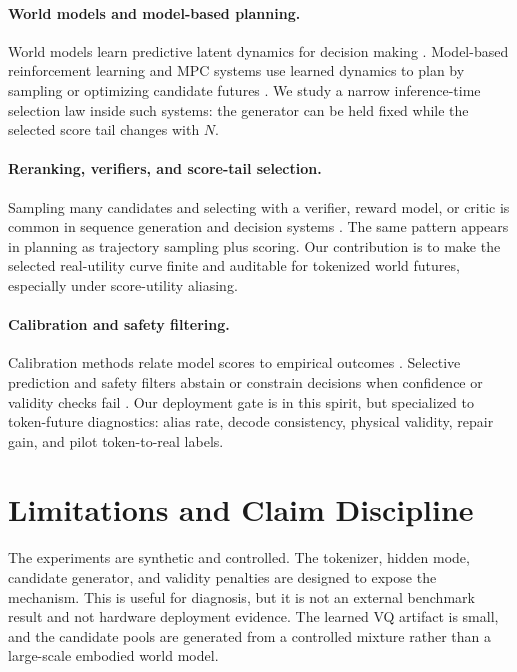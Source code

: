 \documentclass{article}
\begin{document}
\paragraph{World models and model-based planning.}
World models learn predictive latent dynamics for decision making \citep{ha2018world,hafner2019learning,hafner2020dream}. Model-based reinforcement learning and MPC systems use learned dynamics to plan by sampling or optimizing candidate futures \citep{chua2018deep,nagabandi2018neural,williams2017information}. We study a narrow inference-time selection law inside such systems: the generator can be held fixed while the selected score tail changes with $N$.

\paragraph{Reranking, verifiers, and score-tail selection.}
Sampling many candidates and selecting with a verifier, reward model, or critic is common in sequence generation and decision systems \citep{cobbe2021training,nakano2021webgpt,stiennon2020learning}. The same pattern appears in planning as trajectory sampling plus scoring. Our contribution is to make the selected real-utility curve finite and auditable for tokenized world futures, especially under score-utility aliasing.

\paragraph{Calibration and safety filtering.}
Calibration methods relate model scores to empirical outcomes \citep{zadrozny2002transforming,guo2017calibration}. Selective prediction and safety filters abstain or constrain decisions when confidence or validity checks fail \citep{geifman2017selective,wabersich2021predictive}. Our deployment gate is in this spirit, but specialized to token-future diagnostics: alias rate, decode consistency, physical validity, repair gain, and pilot token-to-real labels.

\section{Limitations and Claim Discipline}
\label{sec:limits}

The experiments are synthetic and controlled. The tokenizer, hidden mode, candidate generator, and validity penalties are designed to expose the mechanism. This is useful for diagnosis, but it is not an external benchmark result and not hardware deployment evidence. The learned VQ artifact is small, and the candidate pools are generated from a controlled mixture rather than a large-scale embodied world model.
\end{document}

